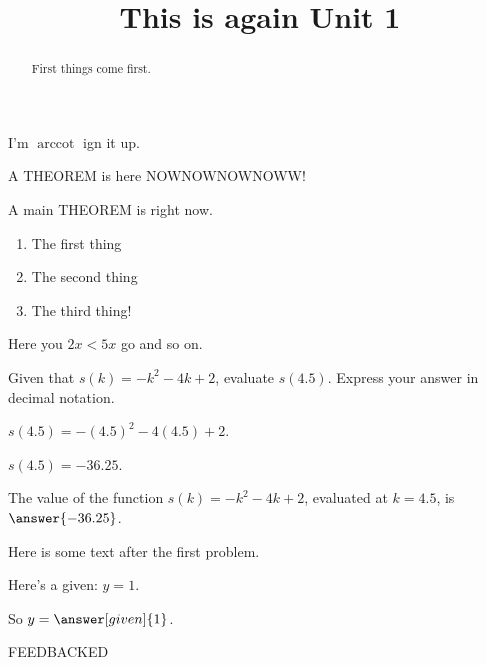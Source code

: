 \documentclass{ximera}
\title{This is again Unit 1}
\DeclareMathOperator{\arccot}{arccot}
\begin{document}
\begin{abstract}
  First things come first.
\end{abstract}

I'm $\arccot$ ign it up.


\begin{theorem}
A THEOREM is here NOWNOWNOWNOWW!
\end{theorem}

\begin{theorem}
A main THEOREM is right now.
\end{theorem}

\begin{image}
\end{image}

\begin{enumerate}
\item The first thing
\item The second thing
\item The third thing!
\end{enumerate}

Here you \(2x < 5x\) go and so on.

\begin{exercise}
Given that $s(k)=-k^2-4 k+2$, evaluate $s(4.5)$. Express your answer in decimal notation.
\begin{hint}
$s(4.5)=-(4.5)^2-4 (4.5)+2$.
\end{hint}
\begin{hint}
$s(4.5)=-36.25$.
\end{hint}
The value of the function $s(k)=-k^2-4 k+2$, evaluated at $k=4.5$, is $\answer{-36.25}$.

Here is some text after the first problem.
\end{exercise}

\begin{exercise}
Here's a given: $y = 1$.

So $y = \answer[given]{1}$.

\begin{feedback}
FEEDBACKED
\end{feedback}
\end{exercise}
\end{document}
